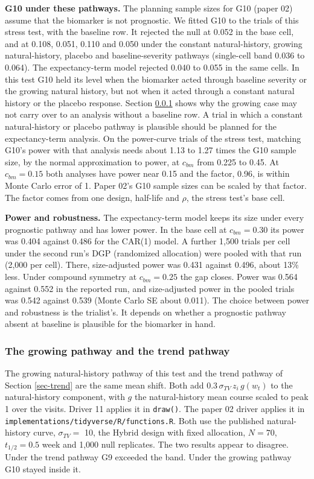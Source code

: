 \documentclass[
  11pt,
]{article}
\begin{document}
\textbf{G10 under these pathways.} The planning sample sizes for G10
(paper 02) assume that the biomarker is not prognostic. We fitted G10 to the
trials of this stress test, with the baseline row. It rejected the
null at 0.052 in the base
cell, and at
0.108,
0.051,
0.110 and
0.050 under the constant natural-history,
growing natural-history, placebo and baseline-severity pathways
(single-cell band 0.036 to 0.064).
The expectancy-term model rejected
0.040 to 0.055 in the
same cells. In this test G10 held its level when the biomarker acted
through baseline severity or the growing natural history, but not when
it acted through a constant natural history or the placebo response.
Section \ref{sec-reconcile} shows why the growing case may not carry
over to an analysis without a baseline row. A trial in which a
constant natural-history or placebo pathway is plausible should be
planned for the expectancy-term analysis. On the power-curve trials of
the stress test, matching G10's power with that analysis needs about
1.13 to 1.27
times the G10 sample size, by the normal approximation to power, at
\(c_{bm}\) from 0.225 to 0.45. At \(c_{bm} = 0.15\) both analyses have
power near 0.15 and the factor,
0.96, is within
Monte Carlo error of 1. Paper 02's G10 sample sizes can be scaled by
that factor. The factor comes from one design, half-life and \(\rho\),
the stress test's base cell.

\textbf{Power and robustness.} The expectancy-term model keeps its size
under every prognostic pathway and has lower power. In the base cell
at \(c_{bm} = 0.30\) its power was
0.404 against
0.486 for the CAR(1) model. A
further 1,500 trials per cell under the second run's DGP (randomized
allocation) were pooled with that run (2,000 per cell). There,
size-adjusted power was 0.431 against
0.496, about
13\%
less. Under compound symmetry at \(c_{bm} = 0.25\) the gap closes. Power
was 0.564 against
0.552 in the reported run, and
size-adjusted power in the pooled trials was
0.542 against
0.539 (Monte Carlo SE about 0.011). The
choice between power and robustness is the trialist's. It depends on
whether a prognostic pathway absent at baseline is plausible for the
biomarker in hand.

\subsubsection{The growing pathway and the trend pathway}\label{sec-reconcile}

The growing natural-history pathway of this test and the trend
pathway of Section \ref{sec-trend} are the same mean shift. Both add
\(0.3\,\sigma_{TV}\,z_i\,g(w_t)\) to the natural-history component,
with \(g\) the natural-history mean course scaled to peak 1 over the
visits. Driver 11 applies it in \texttt{draw()}. The paper 02 driver
applies it in \texttt{implementations/tidyverse/R/functions.R}. Both use the
published natural-history curve, \(\sigma_{TV} =\) 10,
the Hybrid design with fixed allocation, \(N = 70\), \(t_{1/2} = 0.5\)
week and 1,000 null replicates. The two results appear to disagree.
Under the trend pathway G9 exceeded the band. Under the growing
pathway G10 stayed inside it.
\end{document}
